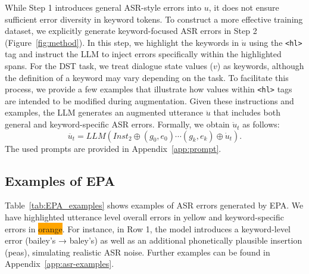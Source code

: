 % 




While Step 1 introduces general ASR-style errors into $u$, it does not ensure sufficient error diversity in keyword tokens. To construct a more effective training dataset, we explicitly generate keyword-focused ASR errors in Step 2 (Figure~\ref{fig:method}). In this step, we highlight the keywords in $\dot{u}$ using the \texttt{<hl>} tag and instruct the LLM to inject errors specifically within the highlighted spans. For the DST task, we treat dialogue state values ($v$) as keywords, although the definition of a keyword may vary depending on the task. To facilitate this process, we provide a few examples that illustrate how values within \texttt{<hl>} tags are intended to be modified during augmentation. Given these instructions and examples, the LLM generates an augmented utterance $\ddot{u}$ that includes both general and keyword-specific ASR errors. Formally, we obtain $\ddot{u}_t$ as follows: 
\begin{equation}
    \ddot{u_t} = LLM(Inst_2 \oplus ({g}_0, {e}_0)\cdots({g}_k, {e}_k)\oplus \dot{u}_t).
\end{equation}
The used prompts are provided in Appendix~\ref{app:prompt}.

\subsection{Examples of EPA}

Table~\ref{tab:EPA_examples} shows examples of ASR errors generated by EPA. We have highlighted utterance level overall errors in \colorbox{yellow(ryb)}{yellow} and keyword-specific errors in \colorbox{orange}{orange}. For instance, in Row 1, the model introduces a keyword-level error (bailey’s → baley’s) as well as an additional phonetically plausible insertion (peas), simulating realistic ASR noise. Further examples can be found in Appendix~\ref{app:asr-examples}.


